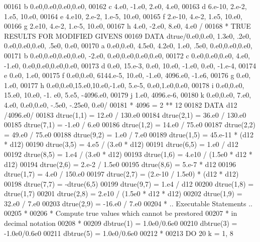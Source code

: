 \begin{DoxyCode}
00161      b          0.e0,0.e0,0.e0,0.e0,
00162      c          4.e0, -1.e0, 2.e0, 4.e0,
00163      d          6.e-10, 2.e-2, 1.e5, 10.e0,
00164      e          4.e10, 2.e-2, 1.e-5, 10.e0,
00165      f          2.e-10, 4.e-2, 1.e5, 10.e0,
00166      g          2.e10, 4.e-2, 1.e-5, 10.e0,
00167      h          4.e0, -2.e0, 8.e0, 4.e0    /
00168 \textcolor{comment}{*    TRUE RESULTS FOR MODIFIED GIVENS}
00169       \textcolor{keyword}{DATA} dtrue/0.e0,0.e0, 1.3e0, .2e0, 0.e0,0.e0,0.e0, .5e0, 0.e0,
00170      a           0.e0,0.e0, 4.5e0, 4.2e0, 1.e0, .5e0, 0.e0,0.e0,0.e0,
00171      b           0.e0,0.e0,0.e0,0.e0, -2.e0, 0.e0,0.e0,0.e0,0.e0,
00172      c           0.e0,0.e0,0.e0, 4.e0, -1.e0, 0.e0,0.e0,0.e0,0.e0,
00173      d           0.e0, 15.e-3, 0.e0, 10.e0, -1.e0, 0.e0, -1.e-4,
00174      e           0.e0, 1.e0,
00175      f           0.e0,0.e0, 6144.e-5, 10.e0, -1.e0, 4096.e0, -1.e6,
00176      g           0.e0, 1.e0,
00177      h           0.e0,0.e0,15.e0,10.e0,-1.e0, 5.e-5, 0.e0,1.e0,0.e0,
00178      i           0.e0,0.e0, 15.e0, 10.e0, -1. e0, 5.e5, -4096.e0,
00179      j           1.e0, 4096.e-6,
00180      k           0.e0,0.e0, 7.e0, 4.e0, 0.e0,0.e0, -.5e0, -.25e0, 0.e0/
00181 \textcolor{comment}{*                   4096 = 2 ** 12}
00182       \textcolor{keyword}{DATA} d12  /4096.e0/
00183       dtrue(1,1) = 12.e0 / 130.e0
00184       dtrue(2,1) = 36.e0 / 130.e0
00185       dtrue(7,1) = -1.e0 / 6.e0
00186       dtrue(1,2) = 14.e0 / 75.e0
00187       dtrue(2,2) = 49.e0 / 75.e0
00188       dtrue(9,2) = 1.e0 / 7.e0
00189       dtrue(1,5) = 45.e-11 * (d12 * d12)
00190       dtrue(3,5) = 4.e5 / (3.e0 * d12)
00191       dtrue(6,5) = 1.e0 / d12
00192       dtrue(8,5) = 1.e4 / (3.e0 * d12)
00193       dtrue(1,6) = 4.e10 / (1.5e0 * d12 * d12)
00194       dtrue(2,6) = 2.e-2 / 1.5e0
00195       dtrue(8,6) = 5.e-7 * d12
00196       dtrue(1,7) = 4.e0 / 150.e0
00197       dtrue(2,7) = (2.e-10 / 1.5e0) * (d12 * d12)
00198       dtrue(7,7) = -dtrue(6,5)
00199       dtrue(9,7) = 1.e4 / d12
00200       dtrue(1,8) = dtrue(1,7)
00201       dtrue(2,8) = 2.e10 / (1.5e0 * d12 * d12)
00202       dtrue(1,9) = 32.e0 / 7.e0
00203       dtrue(2,9) = -16.e0 / 7.e0
00204 \textcolor{comment}{*     .. Executable Statements ..}
00205 \textcolor{comment}{*}
00206 \textcolor{comment}{*     Compute true values which cannot be prestored}
00207 \textcolor{comment}{*     in decimal notation}
00208 \textcolor{comment}{*}
00209       dbtrue(1) = 1.0e0/0.6e0
00210       dbtrue(3) = -1.0e0/0.6e0
00211       dbtrue(5) = 1.0e0/0.6e0
00212 \textcolor{comment}{*}
00213       \textcolor{keywordflow}{DO} 20 k = 1, 8

\end{DoxyCode}
